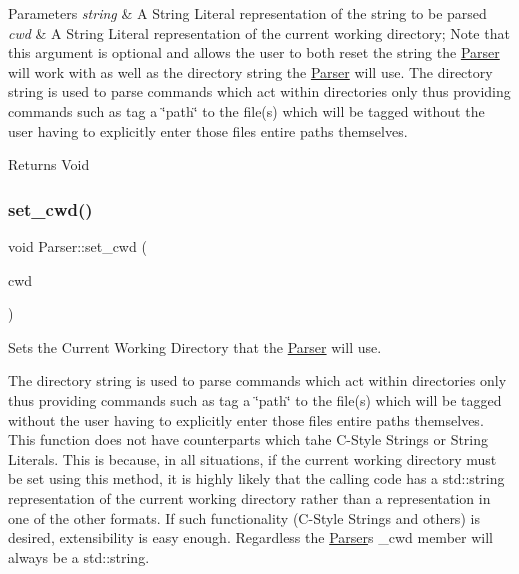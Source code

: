 \begin{DoxyParams}{Parameters}
{\em string} & A String Literal representation of the string to be parsed\\
\hline
{\em cwd} & A String Literal representation of the current working directory; Note that this argument is optional and allows the user to both reset the string the \mbox{\hyperlink{classParser}{Parser}} will work with as well as the directory string the \mbox{\hyperlink{classParser}{Parser}} will use. The directory string is used to parse commands which act within directories only thus providing commands such as \textquotesingle{}tag\textquotesingle{} a \char`\"{}path\char`\"{} to the file(s) which will be tagged without the user having to explicitly enter those file\textquotesingle{}s entire paths themselves.\\
\hline
\end{DoxyParams}
\begin{DoxyReturn}{Returns}
Void 
\end{DoxyReturn}
\mbox{\label{classParser_a086f1431a0cac193fb6ff4506ba5c701}} 
\subsubsection{\texorpdfstring{set\+\_\+cwd()}{set\_cwd()}}
{\footnotesize\ttfamily void Parser\+::set\+\_\+cwd (\begin{DoxyParamCaption}\item[{std\+::string}]{cwd }\end{DoxyParamCaption})}



Sets the Current Working Directory that the \mbox{\hyperlink{classParser}{Parser}} will use. 

The directory string is used to parse commands which act within directories only thus providing commands such as \textquotesingle{}tag\textquotesingle{} a \char`\"{}path\char`\"{} to the file(s) which will be tagged without the user having to explicitly enter those file\textquotesingle{}s entire paths themselves. This function does not have counterparts which tahe C-\/\+Style Strings or String Literals. This is because, in all situations, if the current working directory must be set using this method, it is highly likely that the calling code has a std\+::string representation of the current working directory rather than a representation in one of the other formats. If such functionality (C-\/\+Style Strings and others) is desired, extensibility is easy enough. Regardless the \mbox{\hyperlink{classParser}{Parser}}\textquotesingle{}s \+\_\+cwd member will always be a std\+::string.


